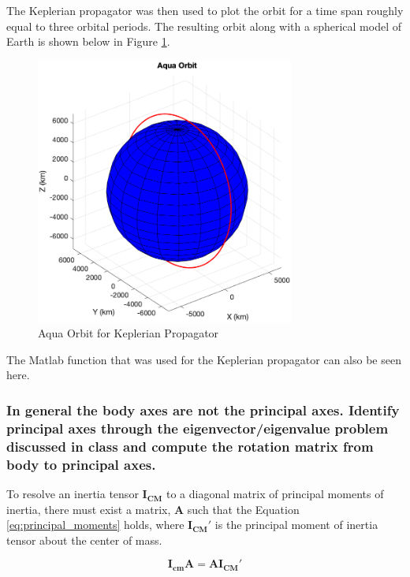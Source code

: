 The Keplerian propagator was then used to plot the orbit for a time span roughly equal to three orbital periods. The resulting orbit along with a spherical model of Earth is shown below in Figure \ref{fig:kep_orbit}.

\begin{figure}[H]
    \centering
    \includegraphics[width = 8.5cm]{Images/aqua_orbit_kepler.png}
    \caption{Aqua Orbit for Keplerian Propagator}
    \label{fig:kep_orbit}
\end{figure}

The Matlab function that was used for the Keplerian propagator can also be seen here.




\subsubsection{In general the body axes are not the principal axes. Identify principal axes through the eigenvector/eigenvalue problem discussed in class and compute the rotation matrix from body to principal axes.} \label{sec:principal_inertia_def_and_calc}

To resolve an inertia tensor $\boldsymbol{I_{CM}}$ to a diagonal matrix of principal moments of inertia, there must exist a matrix, $\boldsymbol{A}$ such that the Equation \ref{eq:principal_moments} holds, where $\boldsymbol{I_{CM}'}$ is the principal moment of inertia tensor about the center of mass.

\begin{equation} \label{eq:principal_moments}
    \boldsymbol{I_{cm} A} = \boldsymbol{A I_{CM}'} 
\end{equation}

